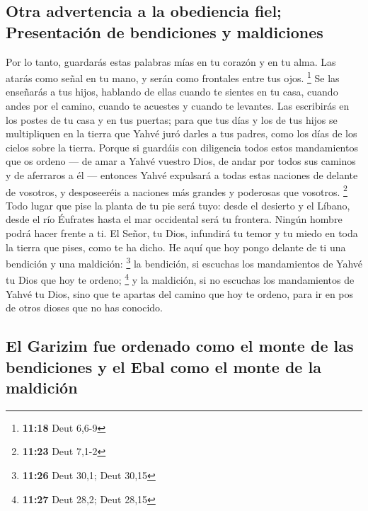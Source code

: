 \hypertarget{otra-advertencia-a-la-obediencia-fiel-presentaciuxf3n-de-bendiciones-y-maldiciones}{%
\subsection{Otra advertencia a la obediencia fiel; Presentación de
bendiciones y
maldiciones}\label{otra-advertencia-a-la-obediencia-fiel-presentaciuxf3n-de-bendiciones-y-maldiciones}}

 Por lo tanto, guardarás estas palabras mías en tu
corazón y en tu alma. Las atarás como señal en tu mano, y serán como
frontales entre tus ojos. \footnote{\textbf{11:18} Deut 6,6-9}
 Se las enseñarás a tus hijos, hablando de ellas cuando
te sientes en tu casa, cuando andes por el camino, cuando te acuestes y
cuando te levantes.  Las escribirás en los postes de tu
casa y en tus puertas;  para que tus días y los de tus
hijos se multipliquen en la tierra que Yahvé juró darles a tus padres,
como los días de los cielos sobre la tierra.  Porque si
guardáis con diligencia todos estos mandamientos que os ordeno --- de
amar a Yahvé vuestro Dios, de andar por todos sus caminos y de aferraros
a él ---  entonces Yahvé expulsará a todas estas naciones
de delante de vosotros, y desposeeréis a naciones más grandes y
poderosas que vosotros. \footnote{\textbf{11:23} Deut 7,1-2}
 Todo lugar que pise la planta de tu pie será tuyo: desde
el desierto y el Líbano, desde el río Éufrates hasta el mar occidental
será tu frontera.  Ningún hombre podrá hacer frente a ti.
El Señor, tu Dios, infundirá tu temor y tu miedo en toda la tierra que
pises, como te ha dicho.  He aquí que hoy pongo delante
de ti una bendición y una maldición: \footnote{\textbf{11:26} Deut 30,1;
  Deut 30,15}  la bendición, si escuchas los mandamientos
de Yahvé tu Dios que hoy te ordeno; \footnote{\textbf{11:27} Deut 28,2;
  Deut 28,15}  y la maldición, si no escuchas los
mandamientos de Yahvé tu Dios, sino que te apartas del camino que hoy te
ordeno, para ir en pos de otros dioses que no has conocido.

\hypertarget{el-garizim-fue-ordenado-como-el-monte-de-las-bendiciones-y-el-ebal-como-el-monte-de-la-maldiciuxf3n}{%
\subsection{El Garizim fue ordenado como el monte de las bendiciones y
el Ebal como el monte de la
maldición}\label{el-garizim-fue-ordenado-como-el-monte-de-las-bendiciones-y-el-ebal-como-el-monte-de-la-maldiciuxf3n}}

